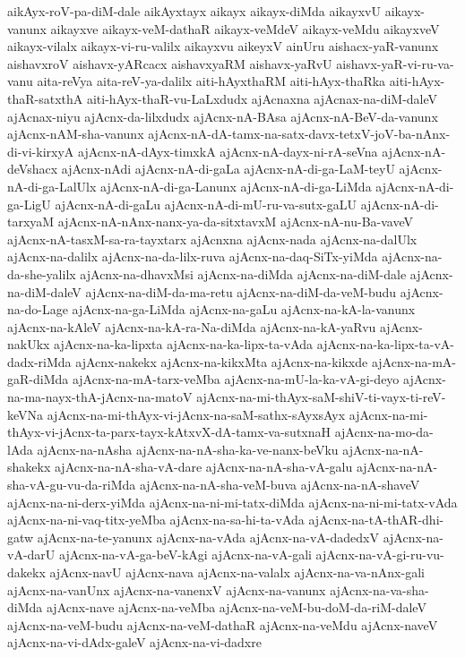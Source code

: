 {aikAyx-roV-pa-diM-dale
aikAyxtayx
aikayx
aikayx-diMda
aikayxvU
aikayx-vanunx
aikayxve
aikayx-veM-dathaR
aikayx-veMdeV
aikayx-veMdu
aikayxveV
aikayx-vilalx
aikayx-vi-ru-valilx
aikayxvu
aikeyxV
ainUru
aishacx-yaR-vanunx
aishavxroV
aishavx-yARcacx
aishavxyaRM
aishavx-yaRvU
aishavx-yaR-vi-ru-va-vanu
aita-reVya
aita-reV-ya-dalilx
aiti-hAyxthaRM
aiti-hAyx-thaRka
aiti-hAyx-thaR-satxthA
aiti-hAyx-thaR-vu-LaLxdudx
ajAcnaxna
ajAcnax-na-diM-daleV
ajAcnax-niyu
ajAcnx-da-lilxdudx
ajAcnx-nA-BAsa
ajAcnx-nA-BeV-da-vanunx
ajAcnx-nAM-sha-vanunx
ajAcnx-nA-dA-tamx-na-satx-davx-tetxV-joV-ba-nAnx-di-vi-kirxyA
ajAcnx-nA-dAyx-timxkA
ajAcnx-nA-dayx-ni-rA-seVna
ajAcnx-nA-deVshacx
ajAcnx-nAdi
ajAcnx-nA-di-gaLa
ajAcnx-nA-di-ga-LaM-teyU
ajAcnx-nA-di-ga-LalUlx
ajAcnx-nA-di-ga-Lanunx
ajAcnx-nA-di-ga-LiMda
ajAcnx-nA-di-ga-LigU
ajAcnx-nA-di-gaLu
ajAcnx-nA-di-mU-ru-va-sutx-gaLU
ajAcnx-nA-di-tarxyaM
ajAcnx-nA-nAnx-nanx-ya-da-sitxtavxM
ajAcnx-nA-nu-Ba-vaveV
ajAcnx-nA-tasxM-sa-ra-tayxtarx
ajAcnxna
ajAcnx-nada
ajAcnx-na-dalUlx
ajAcnx-na-dalilx
ajAcnx-na-da-lilx-ruva
ajAcnx-na-daq-SiTx-yiMda
ajAcnx-na-da-she-yalilx
ajAcnx-na-dhavxMsi
ajAcnx-na-diMda
ajAcnx-na-diM-dale
ajAcnx-na-diM-daleV
ajAcnx-na-diM-da-ma-retu
ajAcnx-na-diM-da-veM-budu
ajAcnx-na-do-Lage
ajAcnx-na-ga-LiMda
ajAcnx-na-gaLu
ajAcnx-na-kA-la-vanunx
ajAcnx-na-kAleV
ajAcnx-na-kA-ra-Na-diMda
ajAcnx-na-kA-yaRvu
ajAcnx-nakUkx
ajAcnx-na-ka-lipxta
ajAcnx-na-ka-lipx-ta-vAda
ajAcnx-na-ka-lipx-ta-vA-dadx-riMda
ajAcnx-nakekx
ajAcnx-na-kikxMta
ajAcnx-na-kikxde
ajAcnx-na-mA-gaR-diMda
ajAcnx-na-mA-tarx-veMba
ajAcnx-na-mU-la-ka-vA-gi-deyo
ajAcnx-na-ma-nayx-thA-jAcnx-na-matoV
ajAcnx-na-mi-thAyx-saM-shiV-ti-vayx-ti-reV-keVNa
ajAcnx-na-mi-thAyx-vi-jAcnx-na-saM-sathx-sAyxsAyx
ajAcnx-na-mi-thAyx-vi-jAcnx-ta-parx-tayx-kAtxvX-dA-tamx-va-sutxnaH
ajAcnx-na-mo-da-lAda
ajAcnx-na-nAsha
ajAcnx-na-nA-sha-ka-ve-nanx-beVku
ajAcnx-na-nA-shakekx
ajAcnx-na-nA-sha-vA-dare
ajAcnx-na-nA-sha-vA-galu
ajAcnx-na-nA-sha-vA-gu-vu-da-riMda
ajAcnx-na-nA-sha-veM-buva
ajAcnx-na-nA-shaveV
ajAcnx-na-ni-derx-yiMda
ajAcnx-na-ni-mi-tatx-diMda
ajAcnx-na-ni-mi-tatx-vAda
ajAcnx-na-ni-vaq-titx-yeMba
ajAcnx-na-sa-hi-ta-vAda
ajAcnx-na-tA-thAR-dhi-gatw
ajAcnx-na-te-yanunx
ajAcnx-na-vAda
ajAcnx-na-vA-dadedxV
ajAcnx-na-vA-darU
ajAcnx-na-vA-ga-beV-kAgi
ajAcnx-na-vA-gali
ajAcnx-na-vA-gi-ru-vu-dakekx
ajAcnx-navU
ajAcnx-nava
ajAcnx-na-valalx
ajAcnx-na-va-nAnx-gali
ajAcnx-na-vanUnx
ajAcnx-na-vanenxV
ajAcnx-na-vanunx
ajAcnx-na-va-sha-diMda
ajAcnx-nave
ajAcnx-na-veMba
ajAcnx-na-veM-bu-doM-da-riM-daleV
ajAcnx-na-veM-budu
ajAcnx-na-veM-dathaR
ajAcnx-na-veMdu
ajAcnx-naveV
ajAcnx-na-vi-dAdx-galeV
ajAcnx-na-vi-dadxre
}
